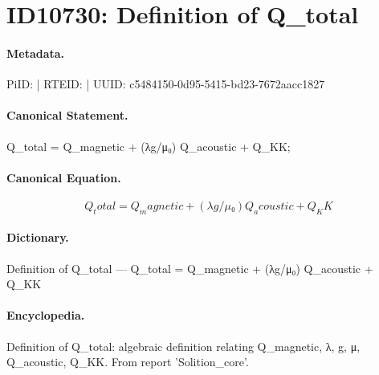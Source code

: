 \section*{ID10730: Definition of Q\_total}
\paragraph{Metadata.}
PiID:  | RTEID:  | UUID: c5484150-0d95-5415-bd23-7672aacc1827

\paragraph{Canonical Statement.}
Q\_total = Q\_magnetic + (λg/μ₀) Q\_acoustic + Q\_KK;

\paragraph{Canonical Equation.}
\[
Q_total = Q_magnetic + (λg/μ₀) Q_acoustic + Q_KK
\]

\paragraph{Dictionary.}
Definition of Q\_total — Q\_total = Q\_magnetic + (λg/μ₀) Q\_acoustic + Q\_KK

\paragraph{Encyclopedia.}
Definition of Q\_total: algebraic definition relating Q\_magnetic, λ, g, μ, Q\_acoustic, Q\_KK. From report 'Solition\_core'.
